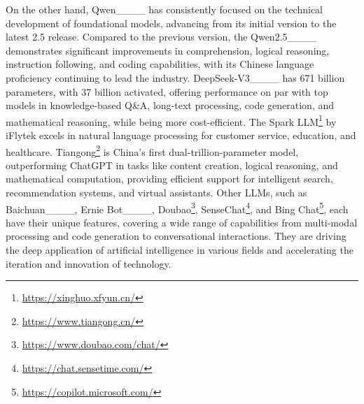 On the other hand, Qwen____ has consistently focused on the technical development of foundational models, advancing from its initial version to the latest 2.5 release. Compared to the previous version, the Qwen2.5____ demonstrates significant improvements in comprehension, logical reasoning, instruction following, and coding capabilities, with its Chinese language proficiency continuing to lead the industry. DeepSeek-V3____ has 671 billion parameters, with 37 billion activated, offering performance on par with top models in knowledge-based Q\&A, long-text processing, code generation, and mathematical reasoning, while being more cost-efficient. The Spark LLM\footnote{\url{https://xinghuo.xfyun.cn/}} by iFlytek excels in natural language processing for customer service, education, and healthcare. Tiangong\footnote{\url{https://www.tiangong.cn/}} is China's first dual-trillion-parameter model, outperforming ChatGPT in tasks like content creation, logical reasoning, and mathematical computation, providing efficient support for intelligent search, recommendation systems, and virtual assistants. Other LLMs, such as Baichuan____, Ernie Bot____, Doubao\footnote{\url{https://www.doubao.com/chat/}}, SenseChat\footnote{\url{https://chat.sensetime.com/}}, and Bing Chat\footnote{\url{https://copilot.microsoft.com/}}, each have their unique features, covering a wide range of capabilities from multi-modal processing and code generation to conversational interactions. They are driving the deep application of artificial intelligence in various fields and accelerating the iteration and innovation of technology.








